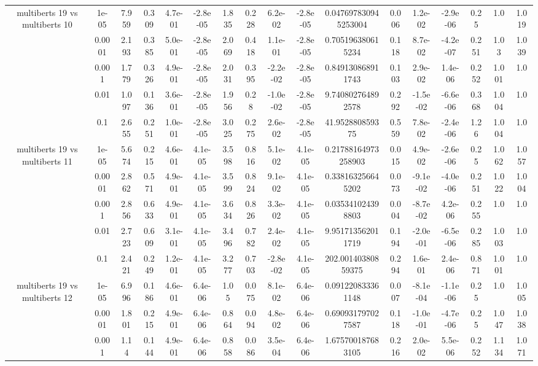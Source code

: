 \begin{tabular}{|c|c|c|c|c|c|c|c|c|c|c|c|c|c|c|c|c|}
\hline
\multirow{5}{*}{multiberts 19 vs multiberts 10} & 1e-05 & 7.959 & 0.309 & 4.7e-01 & -2.8e-05 & 1.835 & 0.228 & 6.2e-02 & -2.8e-05 & 0.047697830945253004 & 0.006 & 1.2e-02 & -2.9e-06 & 0.25 & 1.0 & 1.019 \\
 & 0.0001 & 2.193 & 0.385 & 5.0e-01 & -2.8e-05 & 2.069 & 0.418 & 1.1e-01 & -2.8e-05 & 0.705196380615234 & 0.118 & 8.7e-02 & -4.2e-07 & 0.251 & 1.03 & 1.039 \\
 & 0.001 & 1.779 & 0.326 & 4.9e-01 & -2.8e-05 & 2.031 & 0.395 & -2.2e-02 & -2.8e-05 & 0.849130868911743 & 0.103 & 2.9e-02 & 1.4e-06 & 0.252 & 1.001 & 1.0 \\
 & 0.01 & 1.097 & 0.136 & 3.6e-01 & -2.8e-05 & 1.956 & 0.28 & -1.0e-02 & -2.8e-05 & 9.740802764892578 & 0.292 & -1.5e-02 & -6.6e-06 & 0.368 & 1.004 & 1.0 \\
 & 0.1 & 2.655 & 0.251 & 1.0e-01 & -2.8e-05 & 3.025 & 0.275 & 2.6e-02 & -2.8e-05 & 41.952880859375 & 0.559 & 7.8e-02 & -2.4e-06 & 1.26 & 1.004 & 1.0 \\
\hline
\multirow{5}{*}{multiberts 19 vs multiberts 11} & 1e-05 & 5.674 & 0.215 & 4.6e-01 & 4.1e-05 & 3.598 & 0.816 & 5.1e-02 & 4.1e-05 & 0.21788164973258903 & 0.015 & 4.9e-02 & -2.6e-06 & 0.25 & 1.062 & 1.057 \\
 & 0.0001 & 2.862 & 0.571 & 4.9e-01 & 4.1e-05 & 3.599 & 0.824 & 9.1e-02 & 4.1e-05 & 0.338163256645202 & 0.073 & -9.1e-02 & -4.0e-06 & 0.251 & 1.022 & 1.004 \\
 & 0.001 & 2.856 & 0.633 & 4.9e-01 & 4.1e-05 & 3.634 & 0.826 & 3.3e-02 & 4.1e-05 & 0.035341024398803 & 0.004 & -8.7e-02 & 4.2e-06 & 0.255 & 1.0 & 1.0 \\
 & 0.01 & 2.723 & 0.609 & 3.1e-01 & 4.1e-05 & 3.496 & 0.782 & 2.4e-02 & 4.1e-05 & 9.951713562011719 & 0.194 & -2.0e-01 & -6.5e-06 & 0.285 & 1.003 & 1.0 \\
 & 0.1 & 2.421 & 0.249 & 1.2e-01 & 4.1e-05 & 3.277 & 0.703 & -2.8e-02 & 4.1e-05 & 202.00140380859375 & 0.294 & 1.6e-01 & 2.4e-06 & 0.871 & 1.001 & 1.0 \\
\hline
\multirow{5}{*}{multiberts 19 vs multiberts 12} & 1e-05 & 6.996 & 0.186 & 4.6e-01 & 6.4e-06 & 1.05 & 0.075 & 8.1e-02 & 6.4e-06 & 0.091220833361148 & 0.007 & -8.1e-04 & -1.1e-06 & 0.25 & 1.0 & 1.005 \\
 & 0.0001 & 1.801 & 0.215 & 4.9e-01 & 6.4e-06 & 0.864 & 0.094 & 4.8e-02 & 6.4e-06 & 0.690931797027587 & 0.118 & -1.0e-01 & -4.7e-06 & 0.25 & 1.047 & 1.038 \\
 & 0.001 & 1.14 & 0.144 & 4.9e-01 & 6.4e-06 & 0.858 & 0.086 & 3.5e-04 & 6.4e-06 & 1.675700187683105 & 0.216 & 2.0e-02 & 5.5e-06 & 0.252 & 1.134 & 1.071 \\

\end{tabular}
